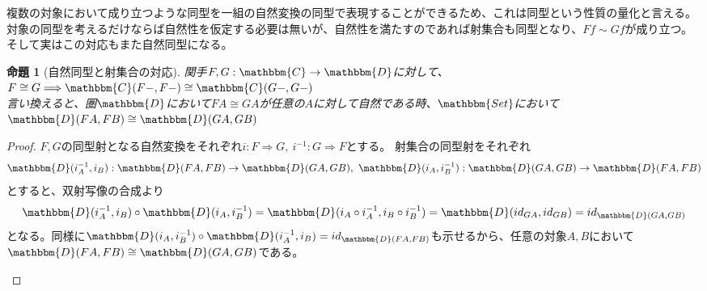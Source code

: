 \documentclass[uplatex,dvipdfmx]{jsarticle}
\newcommand{\cat}[1]{\mathbbm{#1}}
\newcommand{\arrow}{\rightarrow}
\newcommand{\functor}[3]{#1:\cat{#2}\arrow \cat{#3}}
\newcommand{\nat}[3]{#1:#2\Rightarrow #3}
\newcommand{\mor}[3]{#1:#2\arrow #3}
\newcommand{\arset}[3]{\cat{#1}(#2,#3)}
\newtheorem{proof}{証明}[section]
\newtheorem{prop}{命題}[section]
\numberwithin{proof}{subsection}
\numberwithin{prop}{subsection}
\numberwithin{define}{subsection}
\begin{document}
  複数の対象において成り立つような同型を一組の自然変換の同型で表現することができるため、これは同型という性質の量化と言える。
  対象の同型を考えるだけならば自然性を仮定する必要は無いが、自然性を満たすのであれば射集合も同型となり、$Ff\sim Gf$が成り立つ。そして実はこの対応もまた自然同型になる。
  \begin{prop}[自然同型と射集合の対応]
    関手$\functor{F,G}{C}{D}$に対して、
    $F\cong G\Longrightarrow\arset{C}{F-}{F-}\cong\arset{C}{G-}{G-}$\\
    言い換えると、圏$\cat{D}$において$FA\cong GA$が任意の$A$に対して自然である時、$\cat{Set}$において$\arset{D}{FA}{FB}\cong\arset{D}{GA}{GB}$
  \end{prop}
  \begin{proof}
    $F,G$の同型射となる自然変換をそれぞれ$\nat{i}{F}{G},\ \nat{i^{-1}}{G}{F}$とする。
    射集合の同型射をそれぞれ\[\mor{\arset{D}{i^{-1}_A}{i_B}}{\arset{D}{FA}{FB}}{\arset{D}{GA}{GB}},\ \mor{\arset{D}{i_A}{i^{-1}_B}}{\arset{D}{GA}{GB}}{\arset{D}{FA}{FB}}\]とすると、双射写像の合成より\[\arset{D}{i^{-1}_A}{i_B}\circ\arset{D}{i_A}{i^{-1}_B}=\arset{D}{i_A\circ i^{-1}_A}{i_B\circ i^{-1}_B}=\arset{D}{id_{GA}}{id_{GB}}=id_{\arset{D}{GA}{GB}}\]となる。同様に$\arset{D}{i_A}{i^{-1}_B}\circ\arset{D}{i^{-1}_A}{i_B}=id_{\arset{D}{FA}{FB}}$も示せるから、任意の対象$A,B$において$\arset{D}{FA}{FB}\cong\arset{D}{GA}{GB}$である。
    \begin{center}
\end{center}
\end{proof}
\end{document}
